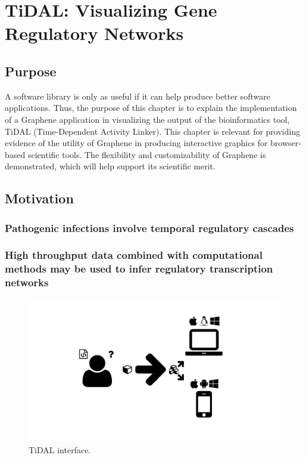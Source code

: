 \chapter{TiDAL: Visualizing Gene Regulatory Networks}
\label{chap:tidal}

\section{Purpose}

A software library is only as useful if it can help produce better software applications.
Thus, the purpose of this chapter is to explain the implementation of a Graphene application in visualizing the output of the bioinformatics tool, TiDAL (Time-Dependent Activity Linker).
This chapter is relevant for providing evidence of the utility of Graphene in producing interactive graphics for browser-based scientific tools.
The flexibility and customizability of Graphene is demonstrated, which will help support its scientific merit.

\section{Motivation}
\subsection{Pathogenic infections involve temporal regulatory cascades}
\subsection{High throughput data combined with computational methods may be used to infer regulatory transcription networks}

\begin{figure}
  \centering
  \includegraphics[width=\textwidth,page=17,trim=0.37cm .65cm 0.37cm 0.3cm, clip=true]{images/Figures.pdf}
  \caption{TiDAL interface.}
  \label{Figure:tidal-landing}
\end{figure}

